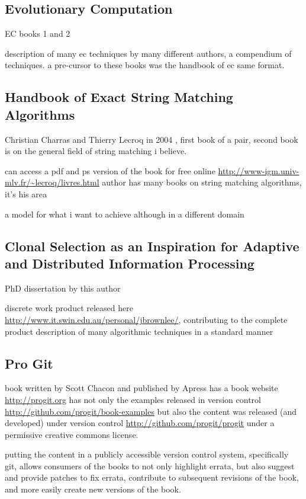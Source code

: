 \documentclass[a4paper, 11pt]{article}
\begin{document}
\subsection{Evolutionary Computation}

EC books 1 \cite{Baeck2000} and 2 \cite{Baeck2000a}

description of many ec techniques by many different authors, a compendium of techniques. a pre-cursor to these books was the handbook of ec \cite{Baeck1997} same format.


\subsection{Handbook of Exact String Matching Algorithms}
Christian Charras and Thierry Lecroq in 2004 \cite{Charras2004}, first book of a pair, second book is on the general field of string matching i believe.

can access a pdf and ps version of the book for free online \url{http://www-igm.univ-mlv.fr/~lecroq/livres.html}
author has many books on string matching algorithms, it's his area 

a model for what i want to achieve although in a different domain


\subsection{Clonal Selection as an Inspiration for Adaptive and Distributed Information Processing}

PhD dissertation by this author \cite{Brownlee2008}

discrete work product released here \url{http://www.it.swin.edu.au/personal/jbrownlee/}, contributing to the complete product 
description of many algorithmic techniques in a standard manner


\subsection{Pro Git}
book written by Scott Chacon and published by Apress \cite{Chacon2009}
has a book website \url{http://progit.org}
has not only the examples released in version control \url{http://github.com/progit/book-examples} but also the content was released (and developed) under version control \url{http://github.com/progit/progit} under a permissive creative commons license. 

putting the content in a publicly accessible version control system, specifically git, allows consumers of the books to not only highlight errata, but also suggest and provide patches to fix errata, contribute to subsequent revisions of the book, and more easily create new versions of the book.
\end{document}
